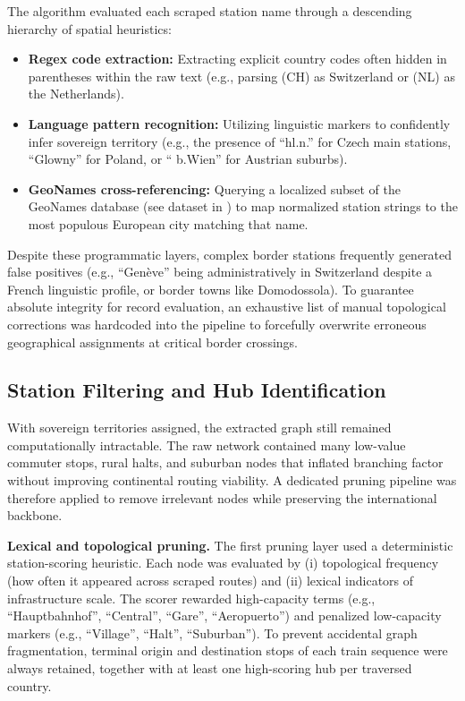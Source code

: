 \medskip

The algorithm evaluated each scraped station name through a descending hierarchy of spatial heuristics:

\begin{itemize}
  \item \textbf{Regex code extraction:} Extracting explicit country codes often hidden in parentheses within the raw text (e.g., parsing (CH) as Switzerland or (NL) as the Netherlands).
  \item \textbf{Language pattern recognition:} Utilizing linguistic markers to confidently infer sovereign territory (e.g., the presence of ``hl.n.'' for Czech main stations, ``Glowny'' for Poland, or `` b.Wien'' for Austrian suburbs).
  \item \textbf{GeoNames cross-referencing:} Querying a localized subset of the GeoNames database (see dataset in \cite{geonames}) to map normalized station strings to the most populous European city matching that name.
\end{itemize}

Despite these programmatic layers, complex border stations frequently generated false positives (e.g., ``Gen\`eve'' being administratively in Switzerland despite a French linguistic profile, or border towns like Domodossola). To guarantee absolute integrity for record evaluation, an exhaustive list of manual topological corrections was hardcoded into the pipeline to forcefully overwrite erroneous geographical assignments at critical border crossings.

\subsection{Station Filtering and Hub Identification}
\label{subsec:station_filtering_hub_identification}
With sovereign territories assigned, the extracted graph still remained computationally intractable. The raw network contained many low-value commuter stops, rural halts, and suburban nodes that inflated branching factor without improving continental routing viability. A dedicated pruning pipeline was therefore applied to remove irrelevant nodes while preserving the international backbone.

\medskip

\noindent\textbf{Lexical and topological pruning.}
The first pruning layer used a deterministic station-scoring heuristic. Each node was evaluated by (i) topological frequency (how often it appeared across scraped routes) and (ii) lexical indicators of infrastructure scale. The scorer rewarded high-capacity terms (e.g., ``Hauptbahnhof'', ``Central'', ``Gare'', ``Aeropuerto'') and penalized low-capacity markers (e.g., ``Village'', ``Halt'', ``Suburban''). To prevent accidental graph fragmentation, terminal origin and destination stops of each train sequence were always retained, together with at least one high-scoring hub per traversed country.

